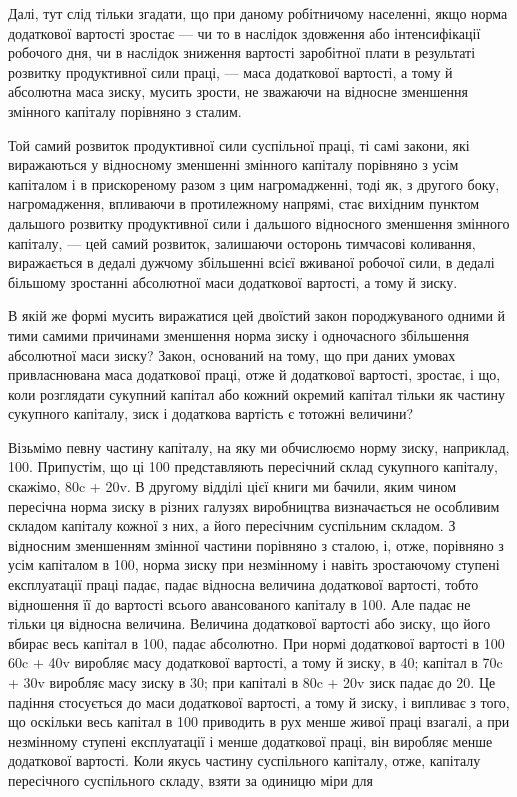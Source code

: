 Далі, тут слід тільки згадати, що при даному робітничому населенні,
якщо норма додаткової вартості зростає — чи то в наслідок
здовження або інтенсифікації робочого дня, чи в наслідок зниження
вартості заробітної плати в результаті розвитку продуктивної
сили праці, — маса додаткової вартості, а тому й абсолютна
маса зиску, мусить зрости, не зважаючи на відносне
зменшення змінного капіталу порівняно з сталим.

Той самий розвиток продуктивної сили суспільної праці, ті самі
закони, які виражаються у відносному зменшенні змінного капіталу
порівняно з усім капіталом і в прискореному разом з цим нагромадженні,
тоді як, з другого боку, нагромадження, впливаючи
в протилежному напрямі, стає вихідним пунктом дальшого розвитку
продуктивної сили і дальшого відносного зменшення змінного
капіталу, — цей самий розвиток, залишаючи осторонь тимчасові
коливання, виражається в дедалі дужчому збільшенні
всієї вживаної робочої сили, в дедалі більшому зростанні абсолютної
маси додаткової вартості, а тому й зиску.

В якій же формі мусить виражатися цей двоїстий закон породжуваного
одними й тими самими причинами зменшення норма
зиску і одночасного збільшення абсолютної маси зиску? Закон,
оснований на тому, що при даних умовах привласнювана маса
додаткової праці, отже й додаткової вартості, зростає, і що, коли
розглядати сукупний капітал або кожний окремий капітал тільки
як частину сукупного капіталу, зиск і додаткова вартість є тотожні
величини?

Візьмімо певну частину капіталу, на яку ми обчислюємо
норму зиску, наприклад, 100. Припустім, що ці 100 представляють
пересічний склад сукупного капіталу, скажімо, 80c + 20v.
В другому відділі цієї книги ми бачили, яким чином пересічна
норма зиску в різних галузях виробництва визначається не особливим
складом капіталу кожної з них, а його пересічним суспільним
складом. З відносним зменшенням змінної частини порівняно
з сталою, і, отже, порівняно з усім капіталом в 100, норма зиску
при незмінному і навіть зростаючому ступені експлуатації праці
падає, падає відносна величина додаткової вартості, тобто відношення
її до вартості всього авансованого капіталу в 100.
Але падає не тільки ця відносна величина. Величина додаткової
вартості або зиску, що його вбирає весь капітал в 100, падає
абсолютно. При нормі додаткової вартості в 100%
60c + 40v виробляє масу додаткової вартості, а тому й зиску,
в 40; капітал в 70c + 30v виробляє масу зиску в  30; при капіталі
в 80c + 20v зиск падає до 20. Це падіння стосується до
маси додаткової вартості, а тому й зиску, і випливає з того,
що оскільки весь капітал в 100 приводить в рух менше живої
праці взагалі, а при незмінному ступені експлуатації
і менше додаткової праці, він виробляє менше додаткової вартості.
Коли якусь частину суспільного капіталу, отже, капіталу
пересічного суспільного складу, взяти за одиницю міри для
